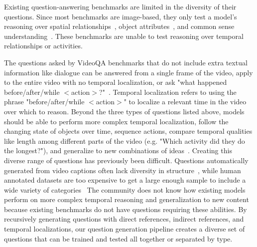 \documentclass[10pt,twocolumn,letterpaper]{article}
\newcommand{\mgm}[1]{{\color{cyan}{mgm: #1}}}
\begin{document}
Existing question-answering benchmarks are limited in the diversity of their questions. Since most benchmarks are image-based, they only test a model's reasoning over spatial relationships~\cite{johnson2017clevr,hudson2019gqa,antol2015vqa,goyal2017making,krishna2017visual,zhu2016visual7w}, object attributes~\cite{johnson2017clevr,hudson2019gqa, antol2015vqa,goyal2017making,krishna2017visual}, and common sense understanding~\cite{zellers2019recognition,antol2015vqa,krishna2017visual}. These benchmarks are unable to test reasoning over temporal relationships or activities. \mgm{clearer common sense specification here}

The questions asked by VideoQA benchmarks that do not include extra textual information like dialogue can be answered from a single frame of the video, apply to the entire video with no temporal localization, or ask "what happened before/after/while $<$action$>$?"~\cite{jang2017tgif,xu2017video, maharaj2017dataset, zeng2016leveraging, yu2019activitynet}. \mgm{a very clunky way of bringing this up. However, I'm not sure how to do it more clearly yet. Think. Also need to address CLEVRER} Temporal localization refers to using the phrase "before/after/while $<$action$>$" to localize a relevant time in the video over which to reason. Beyond the three types of questions listed above, models should be able to perform more complex temporal localization, follow the changing state of objects over time, sequence actions, compare temporal qualities like length among different parts of the video (e.g. "Which activity did they do the longest?"), and generalize to new combinations of ideas~\cite{lake2018generalization,vatashsky2020vqa}. \mgm{re-address this list with the templates we ended up with} Creating this diverse range of questions has previously been difficult. Questions automatically generated from video captions often lack diversity in structure~\cite{yu2019activitynet, jang2017tgif}, while human annotated datasets are too expensive to get a large enough sample to include a wide variety of categories~\cite{zeng2016leveraging, yu2019activitynet}
The community does not know how existing models perform on more complex temporal reasoning and generalization to new content because existing benchmarks do not have questions requiring these abilities. By recursively generating questions with direct references, indirect references, and temporal localizations, our question generation pipeline creates a diverse set of questions that can be trained and tested all together or separated by type. \mgm{making the same pont like 50 different times I want to restructure it a bit to condense all that into one area b/c now it rambles}
\end{document}
